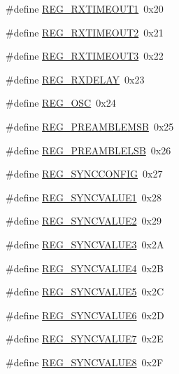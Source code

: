 \begin{DoxyCompactItemize}
\item 
\#define \hyperlink{sx1276Regs-Fsk_8h_afa819749e90d0ecb13a5d75f28af5ccb}{R\+E\+G\+\_\+\+R\+X\+T\+I\+M\+E\+O\+U\+T1}~0x20
\item 
\#define \hyperlink{sx1276Regs-Fsk_8h_aa5870403dc3e6ba5cb5212423051e18a}{R\+E\+G\+\_\+\+R\+X\+T\+I\+M\+E\+O\+U\+T2}~0x21
\item 
\#define \hyperlink{sx1276Regs-Fsk_8h_a8167beac9018acd4f54b530176170145}{R\+E\+G\+\_\+\+R\+X\+T\+I\+M\+E\+O\+U\+T3}~0x22
\item 
\#define \hyperlink{sx1276Regs-Fsk_8h_a8ee126fae09fa47e0ef722dc43a4dc22}{R\+E\+G\+\_\+\+R\+X\+D\+E\+L\+AY}~0x23
\item 
\#define \hyperlink{sx1276Regs-Fsk_8h_a1edb093ed684495473ecd2e97e3a49c2}{R\+E\+G\+\_\+\+O\+SC}~0x24
\item 
\#define \hyperlink{sx1276Regs-Fsk_8h_ab8a433a9dd9c4cebe485d1a1b49cfd4b}{R\+E\+G\+\_\+\+P\+R\+E\+A\+M\+B\+L\+E\+M\+SB}~0x25
\item 
\#define \hyperlink{sx1276Regs-Fsk_8h_a342040215f26acdefd5c95ec7c8ce828}{R\+E\+G\+\_\+\+P\+R\+E\+A\+M\+B\+L\+E\+L\+SB}~0x26
\item 
\#define \hyperlink{sx1276Regs-Fsk_8h_ae80bd3142a5c405bf7063ac7b0e8e101}{R\+E\+G\+\_\+\+S\+Y\+N\+C\+C\+O\+N\+F\+IG}~0x27
\item 
\#define \hyperlink{sx1276Regs-Fsk_8h_a4d0160e654656b6cd6426c295c8e131b}{R\+E\+G\+\_\+\+S\+Y\+N\+C\+V\+A\+L\+U\+E1}~0x28
\item 
\#define \hyperlink{sx1276Regs-Fsk_8h_a840d780f6d455dc828e2ec8217e9043a}{R\+E\+G\+\_\+\+S\+Y\+N\+C\+V\+A\+L\+U\+E2}~0x29
\item 
\#define \hyperlink{sx1276Regs-Fsk_8h_af89062529e96d32eecd0f89963d52adf}{R\+E\+G\+\_\+\+S\+Y\+N\+C\+V\+A\+L\+U\+E3}~0x2A
\item 
\#define \hyperlink{sx1276Regs-Fsk_8h_a9768416ceaebbdeab3fee291f351a98f}{R\+E\+G\+\_\+\+S\+Y\+N\+C\+V\+A\+L\+U\+E4}~0x2B
\item 
\#define \hyperlink{sx1276Regs-Fsk_8h_a834570d54f8b7370a5d42fc180650c14}{R\+E\+G\+\_\+\+S\+Y\+N\+C\+V\+A\+L\+U\+E5}~0x2C
\item 
\#define \hyperlink{sx1276Regs-Fsk_8h_a4e2e2802416f6a445a355828764363e2}{R\+E\+G\+\_\+\+S\+Y\+N\+C\+V\+A\+L\+U\+E6}~0x2D
\item 
\#define \hyperlink{sx1276Regs-Fsk_8h_ac276ab640ba22f4edb9cc206567f1e22}{R\+E\+G\+\_\+\+S\+Y\+N\+C\+V\+A\+L\+U\+E7}~0x2E
\item 
\#define \hyperlink{sx1276Regs-Fsk_8h_ab29ed95bcf10e2b561a2400806344f81}{R\+E\+G\+\_\+\+S\+Y\+N\+C\+V\+A\+L\+U\+E8}~0x2F

\end{DoxyCompactItemize}
